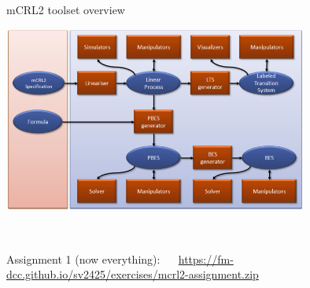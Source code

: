 \documentclass[aspectratio=169]{beamer}
\begin{document}
\begin{slide}{mCRL2 toolset overview}
  \centering
  
  \includegraphics[width=0.75\textwidth]{images/mcrl2-toolset.png}
  
  \\[-10mm]
  \begin{block}{}\centering
    Assignment 1 (now everything): ~~
  \mbox{\alert{\footnotesize\url{https://fm-dcc.github.io/sv2425/exercises/mcrl2-assignment.zip}}}

  \end{block}
\end{slide}
\end{document}
